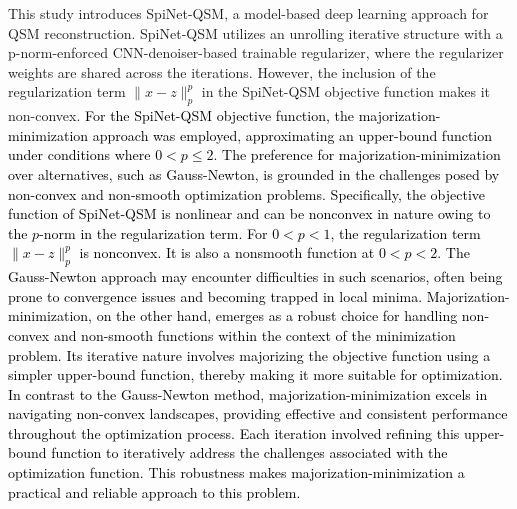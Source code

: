 \documentclass[sn-vancouver,Numbered]{sn-jnl}%
\begin{document}
This study introduces SpiNet-QSM, a model-based deep learning approach for QSM reconstruction. SpiNet-QSM utilizes an unrolling iterative structure with a p-norm-enforced CNN-denoiser-based trainable regularizer, where the regularizer weights are shared across the iterations. However, the inclusion of the regularization term \( \|x - z\|^p_p \) in the SpiNet-QSM objective function makes it non-convex. \textcolor{black}{For the SpiNet-QSM objective function, the majorization-minimization approach was employed, approximating an upper-bound function under conditions where $0 < p \leq 2$. The preference for majorization-minimization \cite{lange2013optimization} over alternatives, such as Gauss-Newton\cite{lange2013optimization,nocedal1999numerical}, is grounded in the challenges posed by non-convex and non-smooth optimization problems. Specifically, the objective function of SpiNet-QSM is nonlinear and can be nonconvex in nature owing to the $p$-norm in the regularization term. For $0 < p < 1$, the regularization term $\|x - z\|^p_p$ is nonconvex. It is also a nonsmooth function at $0 < p < 2$. The Gauss-Newton approach may encounter difficulties in such scenarios, often being prone to convergence issues and becoming trapped in local minima. Majorization-minimization, on the other hand, emerges as a robust choice for handling non-convex and non-smooth functions within the context of the minimization problem. Its iterative nature involves majorizing the objective function using a simpler upper-bound function, thereby making it more suitable for optimization. In contrast to the Gauss-Newton method, majorization-minimization excels in navigating non-convex landscapes, providing effective and consistent performance throughout the optimization process. Each iteration involved refining this upper-bound function to iteratively address the challenges associated with the optimization function. This robustness makes majorization-minimization a practical and reliable approach to this problem.}\\
\end{document}

